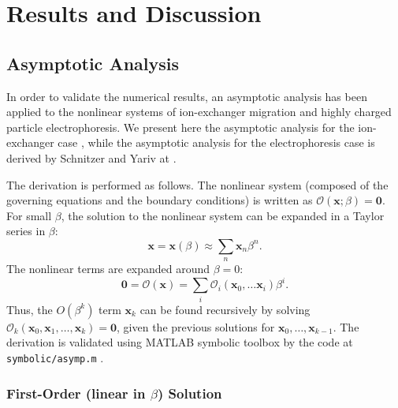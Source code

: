 \documentclass[MSc,beforeExam]{iitcsthesis}
\newcommand\bx{\boldsymbol{x}}
\newcommand\bzero{\boldsymbol{0}}
\newcommand\cO{\mathcal{O}}
\begin{document}
\chapter{Results and Discussion} \label{ch:results}

\section{Asymptotic Analysis} \label{sec:asymp}
In order to validate the numerical results, an asymptotic analysis has been applied 
to the nonlinear systems of ion-exchanger migration 
and highly charged particle electrophoresis.
We present here the asymptotic analysis for the ion-exchanger case \cite{yariv2010migration},
while the asymptotic analysis for the electrophoresis case \cite{schnitzer2012surface}
is derived by Schnitzer and Yariv at \cite{schnitzer2012cubic}.

The derivation is performed as follows.
The nonlinear system (composed of the governing equations and the boundary conditions) 
is written as $\cO(\bx;\beta) = \bzero$.
For small $\beta$, the solution to the nonlinear system can be expanded in a Taylor series in $\beta$:
\begin{equation}
\bx = \bx(\beta) \approx \sum_n \bx_n \beta^n.
\end{equation}
The nonlinear terms
are expanded around $\beta = 0$:
\begin{equation}
\bzero = \cO(\bx) = \sum_i \cO_i(\bx_0, \ldots \bx_i) \beta^i.
\end{equation}
Thus, the $O(\beta^k)$ term $\bx_k$ can be found recursively by solving 
$\cO_k(\bx_0, \bx_1, \ldots, \bx_k) = \bzero$,
given the previous solutions for $\bx_0, \ldots, \bx_{k-1}$.
The derivation is validated using MATLAB symbolic toolbox by the code 
at \verb|symbolic/asymp.m| \cite{source}.

\subsection{First-Order (linear in $\beta$) Solution} \label{app:linear}
\end{document}
